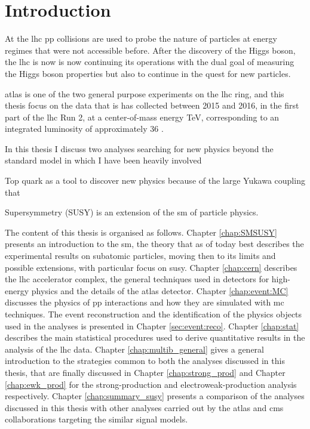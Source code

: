\chapter*{Introduction}

At the \gls{lhc} \gls{pp} collisions are used to probe the nature of particles at energy regimes that were not accessible before. 
After the discovery of the Higgs boson, the \gls{lhc} is now is now continuing its operations with the dual goal 
of measuring the Higgs boson properties but also to continue in the quest for new particles.

\gls{atlas} is one of the two general purpose experiments on the \gls{lhc} ring, and this thesis focus on the data that is has collected between 
2015 and 2016, in the first part of the \gls{lhc} Run 2, at a center-of-mass energy \cmtre TeV, corresponding to an 
integrated luminosity of approximately 36 \ifb. 

In this thesis I discuss two analyses searching for new physics beyond the standard model in which 
I have been heavily involved 

Top quark as a tool to discover new physics because of the large Yukawa coupling that 

Supersymmetry (SUSY) is an extension of the \gls{sm} of particle physics. 

The content of this thesis is organised as follows. Chapter \ref{chap:SMSUSY} presents an introduction to the \gls{sm}, 
the theory that as of today best describes the experimental results on subatomic particles, moving then to its limits and possible 
extensions, with particular focus on \gls{susy}. 
Chapter \ref{chap:cern} describes the \gls{lhc} accelerator complex, the general techniques used in detectors 
for high-energy physics and the details of the \gls{atlas} detector. 
Chapter \ref{chap:event:MC} discusses the physics of \gls{pp} interactions and how they are simulated with \gls{mc} techniques. 
The event reconstruction and the identification of the physics objects used in the analyses is presented in Chapter \ref{sec:event:reco}. 
Chapter \ref{chap:stat} describes the main statistical procedures used to derive quantitative results in the analysis of the \gls{lhc} data.
Chapter \ref{chap:multib_general} gives a general introduction to the strategies common to both the analyses discussed in this thesis, 
that are finally discussed in Chapter \ref{chap:strong_prod} and Chapter \ref{chap:ewk_prod} for the strong-production and 
electroweak-production analysis respectively. 
Chapter \ref{chap:summary_susy} presents a comparison of the analyses discussed in this thesis with other analyses carried out 
by the \gls{atlas} and \gls{cms} collaborations targeting the similar signal models. 
